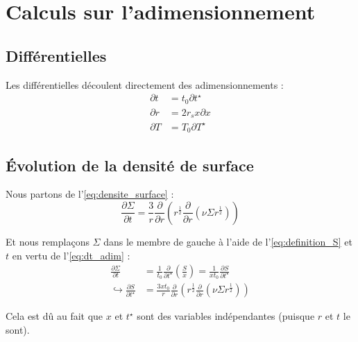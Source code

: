 \section{Calculs sur l’adimensionnement}
\label{app:adimensionnement}

\subsection{Différentielles}

Les différentielles découlent directement des adimensionnements :
\begin{subequations}
    \begin{align}
        \label{eq:dt_adim}
        \partial t &= t_0 \partial t^{\star} \\
        \label{eq:dr_adim}
        \partial r &= 2 r_s x \partial x \\
        \label{eq:dT_adim}
        \partial T &= T_0 \partial T^{\star}
    \end{align}
\end{subequations}

\subsection{Évolution de la densité de surface}
\label{app:densite_surface}

Nous partons de l’\cref{eq:densite_surface} :
\begin{equation}
    \frac{\partial \Sigma}{\partial t} = \frac{3}{r} \frac{\partial}{\partial r} \left( r^\frac{1}{2} \frac{\partial}{\partial r} \left( \nu \Sigma r^\frac{1}{2} \right) \right)
\end{equation}

Et nous remplaçons $\Sigma$ dans le membre de gauche à l’aide de
l’\cref{eq:definition_S} et $t$ en vertu de l’\cref{eq:dt_adim} :
\begin{align}
    \frac{\partial \Sigma}{\partial t} &= \frac{1}{t_0} \frac{\partial}{\partial t^\star} \left( \frac{S}{x} \right) = \frac{1}{x t_0} \frac{\partial S}{\partial t^\star} \\
    \hookrightarrow \frac{\partial S}{\partial t^\star} &= \frac{3 x t_0}{r} \frac{\partial}{\partial r} \left( r^\frac{1}{2} \frac{\partial}{\partial r} \left( \nu \Sigma r^\frac{1}{2} \right) \right)
\end{align}

Cela est dû au fait que $x$ et $t^\star$ sont des variables indépendantes
(puisque $r$ et $t$ le sont).

